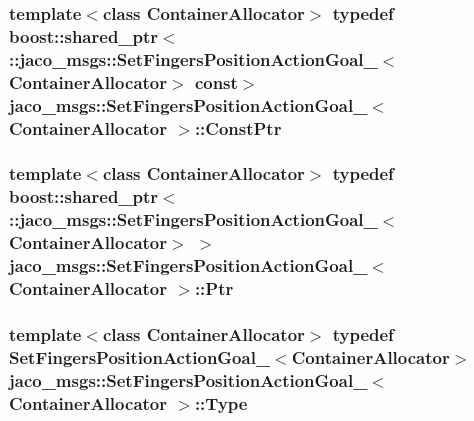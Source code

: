 \subsubsection[{\texorpdfstring{Const\+Ptr}{ConstPtr}}]{\setlength{\rightskip}{0pt plus 5cm}template$<$class Container\+Allocator$>$ typedef boost\+::shared\+\_\+ptr$<$ \+::{\bf jaco\+\_\+msgs\+::\+Set\+Fingers\+Position\+Action\+Goal\+\_\+}$<$Container\+Allocator$>$ const$>$ {\bf jaco\+\_\+msgs\+::\+Set\+Fingers\+Position\+Action\+Goal\+\_\+}$<$ Container\+Allocator $>$\+::{\bf Const\+Ptr}}\hypertarget{structjaco__msgs_1_1SetFingersPositionActionGoal___abb5a10773a57af138b5251d407eb20e8}{}\label{structjaco__msgs_1_1SetFingersPositionActionGoal___abb5a10773a57af138b5251d407eb20e8}
\subsubsection[{\texorpdfstring{Ptr}{Ptr}}]{\setlength{\rightskip}{0pt plus 5cm}template$<$class Container\+Allocator$>$ typedef boost\+::shared\+\_\+ptr$<$ \+::{\bf jaco\+\_\+msgs\+::\+Set\+Fingers\+Position\+Action\+Goal\+\_\+}$<$Container\+Allocator$>$ $>$ {\bf jaco\+\_\+msgs\+::\+Set\+Fingers\+Position\+Action\+Goal\+\_\+}$<$ Container\+Allocator $>$\+::{\bf Ptr}}\hypertarget{structjaco__msgs_1_1SetFingersPositionActionGoal___af0a8d08cc877743c177a1f773efbdbe0}{}\label{structjaco__msgs_1_1SetFingersPositionActionGoal___af0a8d08cc877743c177a1f773efbdbe0}
\subsubsection[{\texorpdfstring{Type}{Type}}]{\setlength{\rightskip}{0pt plus 5cm}template$<$class Container\+Allocator$>$ typedef {\bf Set\+Fingers\+Position\+Action\+Goal\+\_\+}$<$Container\+Allocator$>$ {\bf jaco\+\_\+msgs\+::\+Set\+Fingers\+Position\+Action\+Goal\+\_\+}$<$ Container\+Allocator $>$\+::{\bf Type}}\hypertarget{structjaco__msgs_1_1SetFingersPositionActionGoal___a39246407a8fc4cc43c8714a7e2b44d06}{}\label{structjaco__msgs_1_1SetFingersPositionActionGoal___a39246407a8fc4cc43c8714a7e2b44d06}


